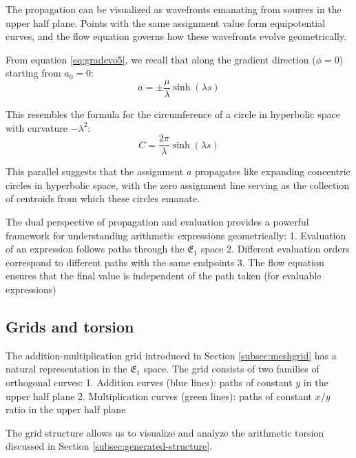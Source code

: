 The propagation can be visualized as wavefronts emanating from sources in the upper half plane. Points with the same assignment value form equipotential curves, and the flow equation governs how these wavefronts evolve geometrically.

From equation \eqref{eq:gradevo5}, we recall that along the gradient direction ($\phi=0$) starting from $a_0=0$:
\begin{equation}
a = \pm \frac{\mu}{\lambda} \sinh(\lambda s)
\end{equation}

This resembles the formula for the circumference of a circle in hyperbolic space with curvature $-\lambda^2$:
\begin{equation}
C = \frac{2\pi}{\lambda} \sinh(\lambda s)
\end{equation}

This parallel suggests that the assignment $a$ propagates like expanding concentric circles in hyperbolic space, with the zero assignment line serving as the collection of centroids from which these circles emanate.

The dual perspective of propagation and evaluation provides a powerful framework for understanding arithmetic expressions geometrically:
1. Evaluation of an expression follows paths through the $\mathfrak{E}_1$ space
2. Different evaluation orders correspond to different paths with the same endpoints
3. The flow equation ensures that the final value is independent of the path taken (for evaluable expressions)

\subsection{Grids and torsion}\label{subsec:gridsandtorsion}

The addition-multiplication grid introduced in Section \ref{subsec:meshgrid} has a natural representation in the $\mathfrak{E}_1$ space. The grid consists of two families of orthogonal curves:
1. Addition curves (blue lines): paths of constant $y$ in the upper half plane
2. Multiplication curves (green lines): paths of constant $x/y$ ratio in the upper half plane

The grid structure allows us to visualize and analyze the arithmetic torsion discussed in Section \ref{subsec:generated-structure}.

